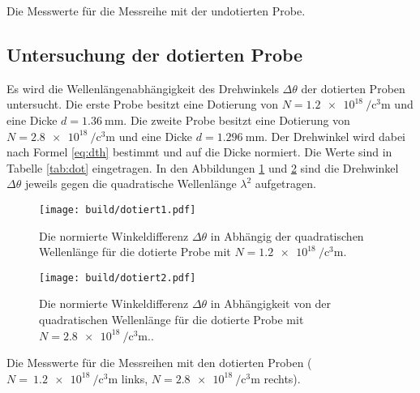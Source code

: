 \begin{table}
	\centering
	\caption{Die Messwerte für die Messreihe mit der undotierten Probe.}
	
	\label{tab:undot}
\end{table}

\subsection{Untersuchung der dotierten Probe}
Es wird die Wellenlängenabhängigkeit des Drehwinkels $\Delta\theta$ der dotierten Proben untersucht. Die erste Probe besitzt eine Dotierung von $N=\SI{1.2e18}{\per\cubic\centi\metre}$ und eine Dicke $d=\SI{1.36}{\milli\metre}$. Die zweite Probe besitzt eine Dotierung von $N=\SI{2.8e18}{\per\cubic\centi\metre}$ und eine Dicke $d=\SI{1.296}{\milli\metre}$. Der Drehwinkel wird dabei nach Formel \eqref{eq:dth} bestimmt und auf die Dicke normiert. Die Werte sind in Tabelle \ref{tab:dot} eingetragen. In den Abbildungen \ref{fig:dot1} und \ref{fig:dot2} sind die Drehwinkel $\Delta\theta$ jeweils gegen die quadratische Wellenlänge $\lambda^2$ aufgetragen.

\begin{figure}
	\centering
	\texttt{[image: build/dotiert1.pdf]}
	\caption{Die normierte Winkeldifferenz $\Delta\theta$ in Abhängig der quadratischen Wellenlänge für die dotierte Probe mit $N=\SI{1.2e18}{\per\cubic\centi\metre}$.}
	\label{fig:dot1}
\end{figure}

\begin{figure}
	\centering
	\texttt{[image: build/dotiert2.pdf]}
	\caption{Die normierte Winkeldifferenz $\Delta\theta$ in Abhängigkeit von der quadratischen Wellenlänge für die dotierte Probe mit $N=\SI{2.8e18}{\per\cubic\centi\metre}$..}
	\label{fig:dot2}
\end{figure}

\begin{table}
	\centering
	\caption{Die Messwerte für die Messreihen mit den dotierten Proben ($N=~\SI{1.2e18}{\per\cubic\centi\metre}$ links, $N=\SI{2.8e18}{\per\cubic\centi\metre}$ rechts).}
	
	
	\label{tab:dot}
\end{table}
\newpage

